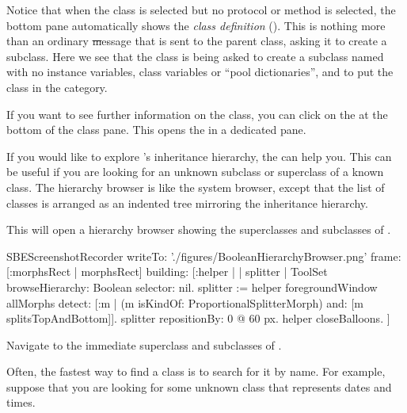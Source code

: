 \documentclass[a4paper,10pt,twoside]{book}
\begin{document}
Notice that when the  class is selected but no protocol or method is selected, the bottom pane automatically shows the \emph{class definition}
().
This is nothing more than an ordinary \st message that is sent to the parent class, asking it to create a subclass.
Here we see that the class  is being asked to create a subclass named  with no instance variables, class variables or ``pool dictionaries'', and to put the class  in the  category.

If you want to see further information on the class, you can click on the  at the bottom of the class pane.
This opens the  in a dedicated pane.

If you would like to explore \sq's inheritance hierarchy, the  can help you.
This can be useful if you are looking for an unknown subclass or superclass of a known class.
The hierarchy browser is like the system browser, except that the list of classes is arranged as an indented tree mirroring the inheritance hierarchy.

\noindent
This will open a hierarchy browser showing the superclasses and subclasses of .

\begin{ExecuteSmalltalkScript}
SBEScreenshotRecorder writeTo: './figures/BooleanHierarchyBrowser.png' frame: [:morphsRect | morphsRect] building: [:helper |
	| splitter |
	ToolSet browseHierarchy: Boolean selector: nil.
	splitter := helper foregroundWindow allMorphs detect: [:m |
		(m isKindOf: ProportionalSplitterMorph) and: [m splitsTopAndBottom]].
	splitter repositionBy: 0 @ 60 px.
	helper closeBalloons.
]
\end{ExecuteSmalltalkScript}

Navigate to the immediate superclass and subclasses of .

Often, the fastest way to find a class is to search for it by name.
For example, suppose that you are looking for some unknown class that represents dates and times.
\end{document}

